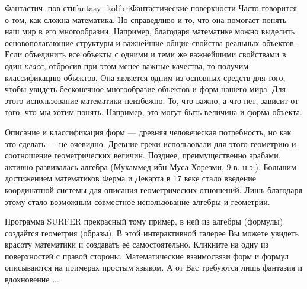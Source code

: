 \begin{surferIntroPage}{Фантастич. пов-сти}{fantasy_kolibri}{Фантастические поверхности}
Часто говорится о том, как сложна математика. Но справедливо и то, что она помогает понять наш мир в его многообразии. Например, благодаря математике можно выделить основополагающие структуры и важнейшие общие свойства реальных объектов. Если объединить все объекты с одними и теми же важнейшими свойствами в один \emph{класс}, отбросив при этом менее важные качества, то получим классификацию объектов. Она является одним из основных средств для того, чтобы увидеть бесконечное многообразие объектов и форм нашего мира. Для этого использование математики неизбежно. То, что важно, а что нет, зависит от того, что мы хотим понять. Например, это могут быть величина и форма объекта.

Описание и классификация форм — древняя человеческая потребность, но как это сделать — не очевидно. Древние греки использовали для этого геометрию и соотношение геометрических величин. Позднее, преимущественно арабами, активно развивалась алгебра (Мухаммед ибн Муса Хорезми, 9 в. н.э.). Большим достижением математиков Ферма и Декарта в 17 веке стало введение координатной системы для описания геометрических отношений. Лишь благодаря этому стало возможным совместное использование алгебры и геометрии. 

Программа SURFER прекрасный тому пример, в ней из алгебры (формулы) создаётся геометрия (образы). В этой интерактивной галерее Вы можете увидеть красоту математики и создавать её самостоятельно. Кликните на одну из поверхностей с правой стороны. Математические взаимосвязи форм и формул описываются на примерах простым языком. А от Вас требуются лишь фантазия и вдохновение ...
\end{surferIntroPage}
